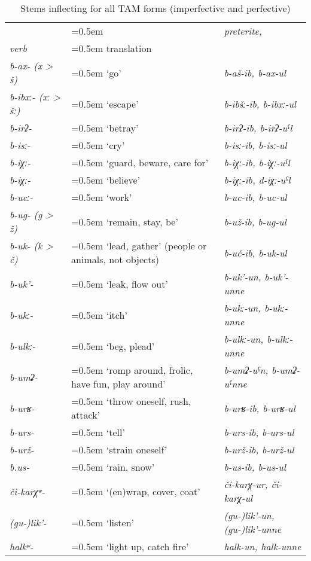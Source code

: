 \begin{table}
	\caption{Stems inflecting for all TAM forms (imperfective and perfective)}
	\label{tab:Stems inflecting for all TAM forms (imperfective and perfective)}
	\small
	\begin{tabularx}{0.98\textwidth}[]{%
		>{\raggedright\arraybackslash\itshape}p{70pt}
		>{\raggedright\arraybackslash\hangindent=0.5em}X
		>{\raggedright\arraybackslash\itshape}X}
		
		\lsptoprule
			{}
		&	{}
		&	\upshape preterite,\\
			\upshape verb
		&	\upshape translation
		&	\upshape \isit{imperfective converb}\\
		\midrule
			b-ax- (x > š) 	&	`go'				&	b-aš-ib, b-ax-ul\\
			b-ibxː- (xː > šː)	&	`escape'			&	b-ibšː-ib, b-ibxː-ul\\
			b-irʡ-			&	`betray'			&	b-irʡ-ib, b-irʡ-uˁl\\
			b-isː-			&	`cry' 				&	b-isː-ib, b-isː-ul\\
			b-iχː-			&	`guard, beware, care for'	&	b-iχː-ib, b-iχː-uˁl\\
			b-iχː-			&	`believe'			&	b-iχː-ib, d-iχː-uˁl\\
			b-ucː-			&	`work'				&	b-uc-ib, b-uc-ul\\
			b-ug- (g > ž)		&	`remain, stay, be'		&	b-už-ib, b-ug-ul\\
			b-uk- (k > č)		&	`lead, gather' (people or animals, not objects)	&	b-uč-ib, b-uk-ul\\
			b-uk'-			&	`leak, flow out'		&	b-uk'-un, b-uk'-unne\\
			b-ukː-			&	`itch'				&	b-ukː-un, b-ukː-unne\\
			b-ulkː-			&	`beg, plead'			&	b-ulkː-un, b-ulkː-unne\\
			b-umʡ-		&	`romp around, frolic, have fun, play around'	&	b-umʡ-uˁn, b-umʡ-uˁnne\\
			b-urʁ-			&	`throw oneself, rush, attack' &	b-urʁ-ib, b-urʁ-ul\\
			b-urs- 		&	`tell'				&	b-urs-ib, b-urs-ul\\
			b-urž-			&	`strain oneself'		&	b-urž-ib, b-urž-ul\\
			b.us-			&	`rain, snow'			&	b-us-ib, b-us-ul\\
			či-karχʷ-		&	`(en)wrap, cover, coat'	&	či-karχ-ur, či-karχ-ul\\
			(gu-)lik'-		&	`listen'				&	(gu-)lik'-un, (gu-)lik'-unne\\
			halkʷ-			&	`light up, catch fire'		&	halk-un, halk-unne\\

\end{tabularx}
\end{table}
